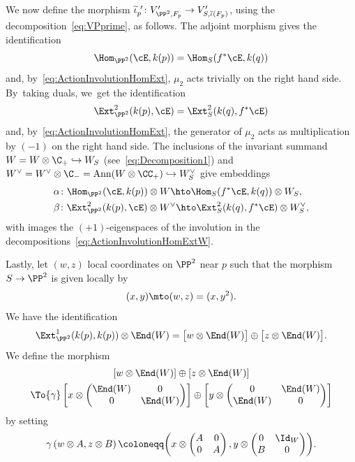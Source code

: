 We now define the morphism $\widetilde{\iota}_p^{\ \prime}\colon V_{\PP^2,F_p}'\to V_{S,\overline{\iota}(F_p)}'$, using the decomposition~\eqref{eq:VPprime}, as follows.
The adjoint morphism gives the identification
\[
\Hom_{\PP^2}(\cE,k(p))=\Hom_{S}(f^*\cE,k(q))
\]
and, by~\eqref{eq:ActionInvolutionHomExt}, $\mu_2$ acts trivially on the right hand side. By~taking duals, we~get the identification
\[
\Ext^2_{\PP^2}(k(p),\cE)=\Ext^2_{S}(k(q),f^*\cE)
\]
and, by~\eqref{eq:ActionInvolutionHomExt}, the generator of $\mu_2$ acts as multiplication by $(-1)$ on the right hand side.
The inclusions of the invariant summand $W=W\otimes\C_+\hookrightarrow W_S$ (see~\eqref{eq:Decomposition1}) and~$W^{\vee}=W^{\vee}\otimes\C_-=\mathrm{Ann}(W\otimes\CC_{+})\hookrightarrow W_S^{\vee}$ give embeddings
\begin{equation}\label{eq:DefOfIotaHatFirstTwoFactors}
\begin{split}
&\alpha\colon \Hom_{\PP^2}(\cE,k(p))\otimes W \hto \Hom_{S}(f^*\cE,k(q))\otimes W_S,\\
&\beta\colon \Ext^2_{\PP^2}(k(p),\cE)\otimes W^\vee\hto \Ext^2_{S}(k(q),f^*\cE)\otimes W_S^\vee,
\end{split}
\end{equation}
with images the $(+1)$-eigenspaces of the involution in the decompositions~\eqref{eq:ActionInvolutionHomExtW}.

Lastly, let $(w,z)$ local coordinates on $\PP^2$ near $p$ such that the morphism $S\to\PP^2$ is given locally by
\[
(x,y)\mto (w,z)=(x,y^2).
\]
We have the identification
\[
\Ext^1_{\PP^2}(k(p),k(p))\otimes \End(W)=\bigl[w\otimes \End(W)\bigr] \oplus \bigl[z\otimes \End(W)\bigr].
\]
We define the morphism
\begin{multline}
\left[w\otimes \End(W)\right] \oplus \left[z\otimes \End(W)\right] \\
\To{\gamma}\left[x \otimes \begin{pmatrix}\End(W)&0\\0&\End(W)\end{pmatrix}\right] \oplus \left[y\otimes \begin{pmatrix}0&\End(W)\\ \End(W)&0\end{pmatrix}\right]
\end{multline}
by setting
\begin{equation}\label{eq:MorphismPhi}
\gamma\left(w\otimes A,z\otimes B\right)\coloneqq\biggl(x \otimes \begin{pmatrix}A&0\\0&A\end{pmatrix},y\otimes \begin{pmatrix}0&\Id_W\\ B&0\end{pmatrix}\biggr).
\end{equation}

